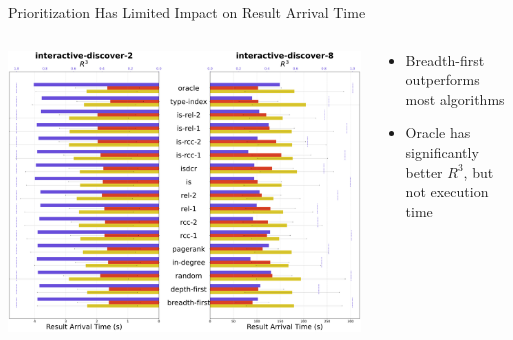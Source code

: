 

\begin{frame}{Prioritization Has Limited Impact on Result Arrival Time}
    \begin{columns}[T] %
        \begin{column}{0.6\textwidth} %
            \includegraphics[width=\linewidth]{images/reduced-result-plot-presentation.pdf} %
        \end{column}

        \begin{column}{0.4\textwidth}
          \begin{itemize}
              \item Breadth-first outperforms most algorithms
              \item Oracle has significantly better $R^{3}$, but not execution time
          \end{itemize}
        \end{column}
    \end{columns}
\end{frame}



